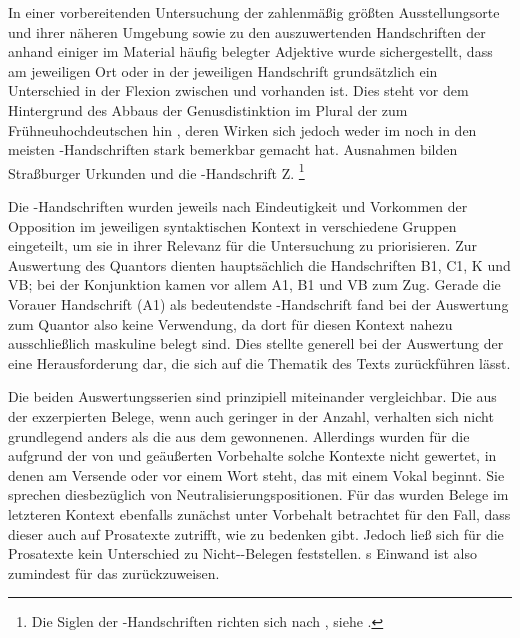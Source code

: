 In einer vorbereitenden Untersuchung der zahlenmäßig größten Ausstellungs\-orte
und ihrer näheren Umgebung sowie zu den auszuwertenden Handschriften der
\KC{} anhand einiger im Material häufig belegter Adjektive wurde
sichergestellt, dass am jeweiligen Ort oder in der jeweiligen Handschrift
grundsätzlich ein Unterschied in der Flexion zwischen  und
 vorhanden ist. Dies steht vor dem Hintergrund des Abbaus der
Genusdistinktion im Plural der  zum
Frühneuhochdeutschen hin
\autocite[191--192]{reichmannwegera1993}, deren Wirken sich jedoch weder im
\CAO{} noch in den meisten \KC-Handschriften stark bemerkbar gemacht hat.
Ausnahmen bilden Straßburger Urkunden und die \KC{}-Handschrift Z.%
%
	\footnote{Die Siglen der \KC-Handschriften richten sich nach
		, siehe .}

Die \KC{}-Handschriften wurden jeweils nach Eindeutigkeit und Vorkommen der
Opposition im jeweiligen syntaktischen Kontext in verschiedene Gruppen
eingeteilt, um sie in ihrer Relevanz für die Untersuchung zu priorisieren. Zur
Auswertung des Quantors  dienten hauptsächlich die Handschriften
B1, C1, K und VB; bei der Konjunktion  kamen vor allem A1, B1 und
VB zum Zug. Gerade die Vorauer Handschrift (A1) als bedeutendste
\KC{}-Handschrift fand bei der Auswertung zum Quantor  also keine
Verwendung, da dort für diesen Kontext nahezu ausschließlich maskuline
 belegt sind. Dies stellte generell bei der Auswertung der
\KC{} eine Herausforderung dar, die sich auf die Thematik des Texts
zurückführen lässt.

Die beiden Auswertungsserien sind prinzipiell miteinander vergleichbar. Die aus
der \KC{} exzerpierten Belege, wenn auch geringer in der Anzahl, verhalten sich
nicht grundlegend anders als die aus dem \CAO{} gewonnenen. Allerdings wurden
für die \KC{} aufgrund der von \citet[89--90]{askedal1973} und
\citet[191]{gjelsten1980} geäußerten Vorbehalte solche Kontexte nicht gewertet,
in denen  am Versende oder vor einem Wort steht, das mit einem
Vokal beginnt. Sie sprechen diesbezüglich von Neutralisierungs\-positionen. Für
das \CAO{} wurden Belege im letzteren Kontext ebenfalls zunächst unter
Vorbehalt betrachtet für den Fall, dass dieser auch auf Prosatexte zutrifft,
wie \citet[92]{askedal1973} zu bedenken gibt. Jedoch ließ sich für die
Prosatexte kein Unterschied zu
Nicht-\allowbreak{}-\allowbreak{}Belegen feststellen.
\citeauthor{askedal1973}s Einwand ist also zumindest für das \CAO{}
zurückzuweisen.


